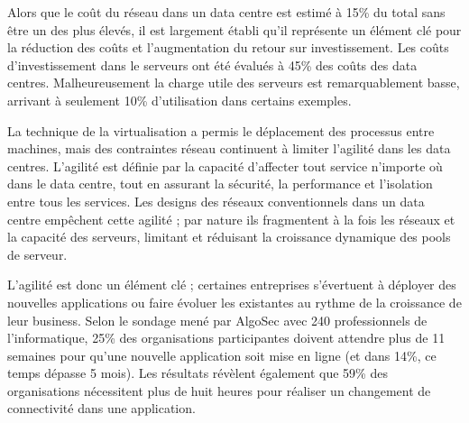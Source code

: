 \par
Alors que le coût du réseau dans un data centre est estimé à 15\% \cite{cloudCosts} du total sans être un des plus élevés, il est largement établi qu'il représente un élément clé pour la réduction des coûts et l'augmentation du retour sur investissement. Les coûts d'investissement dans le serveurs ont été évalués à 45\% des coûts des data centres. Malheureusement la charge utile des serveurs est remarquablement basse, arrivant à seulement 10\% d'utilisation dans certains exemples.

\par 
La technique de la virtualisation a permis le déplacement des processus entre machines, mais des contraintes réseau continuent à limiter l'agilité dans les data centres. L'agilité est définie par la capacité d'affecter tout service n'importe où dans le data centre, tout en assurant la sécurité, la performance et l'isolation entre tous les services. Les designs des réseaux conventionnels dans un data centre empêchent cette agilité ; par nature ils fragmentent  à la fois les réseaux et la capacité des serveurs, limitant et réduisant la croissance dynamique des pools de serveur. \cite{cloudCostsAgility}



\par 
L'agilité est donc un élément clé ; certaines entreprises s'évertuent à déployer des nouvelles applications ou faire évoluer les existantes au rythme de la croissance de leur business. Selon le sondage mené par AlgoSec avec 240 professionnels de l'informatique, 25\% des organisations participantes doivent attendre plus de 11 semaines pour qu'une nouvelle application soit mise en ligne (et dans 14\%, ce temps dépasse 5 mois). Les résultats révèlent également que 59\% des organisations nécessitent plus de huit heures pour réaliser un changement de connectivité dans une application. \cite{algoSecSurvey}


